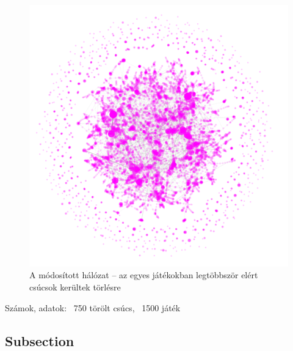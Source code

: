 \documentclass[fleqn,10pt]{wlscirep}
\begin{document}
\begin{figure}[H]
\centering
\includegraphics[width=\linewidth]{figs/sca_2.png}
\caption{A módosított hálózat -- az egyes játékokban legtöbbször elért csúcsok kerültek törlésre}
\label{fig:mody}
\end{figure}

Számok, adatok: ~750 törölt csúcs, ~1500 játék




\subsection*{Subsection}
\end{document}
